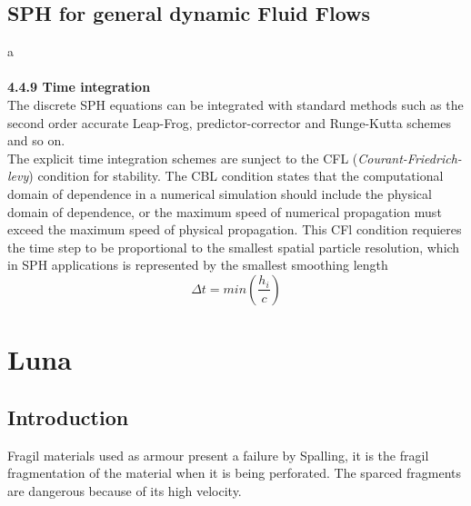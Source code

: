 \documentclass[12pt]{book}
\begin{document}
\section{SPH for general dynamic Fluid Flows}
 a
 \\\\
\textbf{4.4.9 Time integration}
\\The discrete SPH equations can be integrated with standard methods such as the second order accurate Leap-Frog, predictor-corrector and Runge-Kutta schemes and so on.\\
The explicit time integration schemes are sunject to the CFL (\textit{Courant-Friedrich-levy}) condition for stability. The CBL condition states that the computational domain of dependence in a numerical simulation should include the physical domain of dependence, or the maximum speed of numerical propagation must exceed the maximum speed of physical propagation. This CFl condition requieres the time step to be proportional to the smallest spatial particle resolution, which in SPH applications is represented by the smallest smoothing length\cite{Liu_SPH}
\[\Delta t=min\left(\frac{h_i}{c}\right)\]

\chapter{Luna}
\section{Introduction}
Fragil materials used as armour present a failure by Spalling, it is the fragil fragmentation of the material when it is being perforated. The sparced fragments are dangerous because of its high velocity.\\ \\
\end{document}
